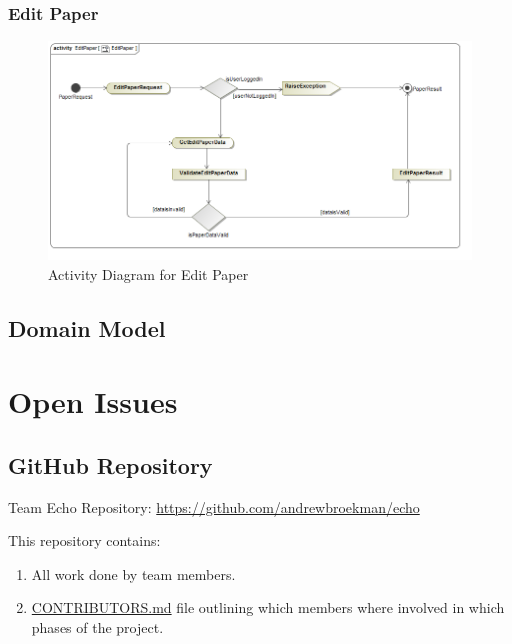 \documentclass[a4paper,10pt]{article}
\begin{document}
\subsubsection{Edit Paper}
	\begin{figure}[h]
		\includegraphics[scale=0.5]{Activity_EditPaper}
		\caption{Activity Diagram for Edit Paper}
	\end{figure}

	
	
\subsection{Domain Model}

\section{Open Issues}
\subsection {GitHub Repository}
Team Echo Repository: \url{https://github.com/andrewbroekman/echo}

This repository contains:
\begin{enumerate}
\item All work done by team members.
\item \href{https://github.com/andrewbroekman/echo/blob/master/CONTRIBUTORS.md}{CONTRIBUTORS.md} file outlining which members where involved in which phases of the project.
\end{enumerate}
\end{document}
